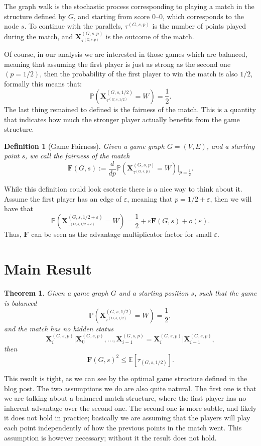 \documentclass{article}
\newtheorem{theorem}{Theorem}
\newtheorem{definition}{Definition}
\newcommand{\win}{W}
\newcommand{\x}{\mathbf{X}}
\newcommand{\xgp}{\x^{\left(G, s, p\right)}}
\newcommand{\xge}{\x^{\left(G, s, 1/2 + \varepsilon\right)}}
\newcommand{\xghalf}{\x^{\left(G, s, 1/2\right)}}
\newcommand{\taugp}{{\tau^{\left(G, s, p\right)}}}
\newcommand{\taughalf}{{\tau^{\left(G, s, 1/2\right)}}}
\newcommand{\tauge}{{\tau^{\left(G, s, 1/2 + \varepsilon\right)}}}
\newcommand{\ex}{\mathbb{E}}
\newcommand{\pr}{\mathbb{P}}
\newcommand{\fair}{\mathbf{F}}
\begin{document}
The graph walk is the stochastic process corresponding to playing a match in the structure defined by $G$, and starting from score 0--0, which corresponds to the node $s$. To continue with the parallels, $\taugp$ is the number of points played during the match, and $\xgp_\taugp$ is the outcome of the match.

Of course, in our analysis we are interested in those games which are balanced, meaning that assuming the first player is just as strong as the second one $\left(p=1/2\right)$, then the probability of the first player to win the match is also $1/2$, formally this means that:
$$
\pr \left( \xghalf_\taughalf = \win\right)= \frac12.
$$
The last thing remained to defined is the fairness of the match. This is a quantity that indicates how much the stronger player actually benefits from the game structure. 

\begin{definition}[Game Fairness]
Given a game graph $G = (V, E)$, and a starting point $s$, we call the fairness of the match
$$
\fair(G, s) := \frac{d}{dp}\pr \left( \xgp_\taugp = \win\right)\Big\vert_{p=\frac12}.
$$
\end{definition}
While this definition could look esoteric there is a nice way to think about it. Assume the first player has an edge of $\varepsilon$, meaning that $p = 1/2 + \varepsilon$, then we will have that
$$
\pr\left(\xge_\tauge = \win\right) = \frac12 + \varepsilon\fair(G, s) + o(\varepsilon).
$$
Thus, $\fair$ can be seen as the advantage multiplicator factor for small $\varepsilon$.

\section*{Main Result}
\begin{theorem}
Given a game graph $G$ and a starting position $s$, such that the game is balanced
$$
\pr \left( \xghalf_\taughalf = \win\right)= \frac12, 
$$
and the match has no hidden status
$$
\xgp_i \vert \xgp_{0}, \dots, \xgp_{i-1} = \xgp_i \vert \xgp_{i-1},
$$
then
$$
\fair(G, s) ^2\leq \ex[\tau_{(G, s, 1/2)}].
$$
\end{theorem}
This result is tight, as we can see by the optimal game structure defined in the blog post.
The two assumptions we do are also quite natural. The first one is that we are talking about a balanced match structure, where the first player has no inherent advantage over the second one. The second one is more subtle, and likely it does not hold in practice; basically we are assuming that the players will play each point independently of how the previous points in the match went. This assumption is however necessary; without it the result does not hold.
\end{document}
